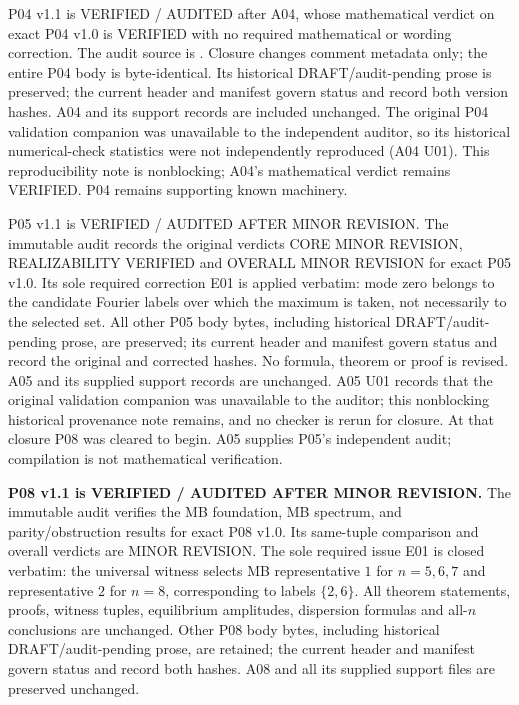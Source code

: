 \documentclass[11pt]{article}
\begin{document}
\smallskip\noindent P04 v1.1 is VERIFIED / AUDITED after A04, whose
mathematical verdict on exact P04 v1.0 is VERIFIED with no required
mathematical or wording correction. The audit source is
. Closure changes
comment metadata only; the entire P04 body is byte-identical. Its historical
DRAFT/audit-pending prose is preserved; the current header and manifest
govern status and record both version hashes. A04 and its support records
are included unchanged. The original P04 validation companion was
unavailable to the independent auditor, so its historical numerical-check
statistics were not independently reproduced (A04 U01). This reproducibility
note is nonblocking; A04's mathematical verdict remains VERIFIED.
P04 remains supporting known machinery.

\smallskip\noindent P05 v1.1 is VERIFIED / AUDITED AFTER MINOR REVISION.
The immutable audit  records the
original verdicts CORE MINOR REVISION, REALIZABILITY VERIFIED and OVERALL
MINOR REVISION for exact P05 v1.0. Its sole required correction E01 is
applied verbatim: mode zero belongs to the candidate Fourier labels over
which the maximum is taken, not necessarily to the selected set. All other
P05 body bytes, including historical DRAFT/audit-pending prose, are preserved;
its current header and manifest govern status and record the original and
corrected hashes. No formula, theorem or proof is revised. A05 and its
supplied support records are unchanged. A05 U01 records that the original
validation companion was unavailable to the auditor; this nonblocking
historical provenance note remains, and no checker is rerun for closure.
At that closure P08 was cleared to begin. A05 supplies P05's independent
audit; compilation is not mathematical verification.

\smallskip\noindent\textbf{P08 v1.1 is VERIFIED / AUDITED AFTER MINOR REVISION.}
The immutable audit 
verifies the MB foundation, MB spectrum, and parity/obstruction results
for exact P08 v1.0. Its same-tuple comparison and overall verdicts are
MINOR REVISION. The sole required issue E01 is closed verbatim:
the universal witness selects MB representative $1$ for $n=5,6,7$
and representative $2$ for $n=8$, corresponding to labels $\{2,6\}$.
All theorem statements, proofs, witness tuples, equilibrium amplitudes,
dispersion formulas and all-$n$ conclusions are unchanged. Other P08
body bytes, including historical DRAFT/audit-pending prose, are retained;
the current header and manifest govern status and record both hashes.
A08 and all its supplied support files are preserved unchanged.
\end{document}
